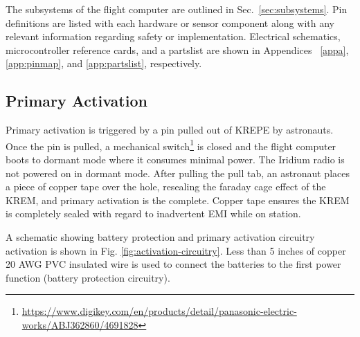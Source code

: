\documentclass{article}
\begin{document}
The subsystems of the flight computer are outlined in Sec.~\ref{sec:subsystems}. Pin definitions are listed with each hardware or sensor component along with any relevant information regarding safety or implementation. Electrical schematics, microcontroller reference cards, and a partslist are shown in  Appendices ~\ref{appa}, \ref{app:pinmap}, and \ref{app:partslist}, respectively.


\subsection{Primary Activation}
\label{sec:primary-activation}


Primary activation is triggered by a pin pulled out of KREPE by astronauts. Once the pin is pulled, a mechanical switch\footnote{\url{https://www.digikey.com/en/products/detail/panasonic-electric-works/ABJ362860/4691828}} is closed and the flight computer boots to dormant mode where it consumes minimal power. The Iridium radio is not powered on in dormant mode. After pulling the pull tab, an astronaut places a piece of copper tape over the hole, resealing the faraday cage effect of the KREM, and primary activation is the complete. Copper tape ensures the KREM is completely sealed with regard to inadvertent EMI while on station.

A schematic showing battery protection and primary activation circuitry activation is shown in Fig. \ref{fig:activation-circuitry}. Less than 5 inches of copper 20 AWG PVC insulated wire is used to connect the batteries to the first power function (battery protection circuitry).


\end{document}
